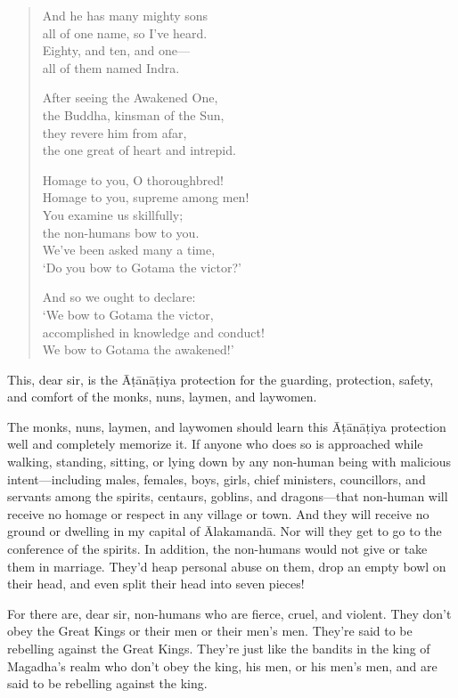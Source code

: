 \documentclass[12pt,openany]{book}%
\begin{document}
\begin{verse}
And he has many mighty sons \\
all of one name, so I’ve heard. \\
Eighty, and ten, and one—\\
all of them named Indra. 

After seeing the Awakened One, \\
the Buddha, kinsman of the Sun, \\
they revere him from afar, \\
the one great of heart and intrepid. 

Homage to you, O thoroughbred! \\
Homage to you, supreme among men! \\
You examine us skillfully; \\
the non-humans bow to you. \\
We’ve been asked many a time, \\
‘Do you bow to Gotama the victor?’ 

And so we ought to declare: \\
‘We bow to Gotama the victor, \\
accomplished in knowledge and conduct! \\
We bow to Gotama the awakened!’ 

%
\end{verse}

This, dear sir, is the \textsanskrit{Āṭānāṭiya} protection for the guarding, protection, safety, and comfort of the monks, nuns, laymen, and laywomen. 

The monks, nuns, laymen, and laywomen should learn this \textsanskrit{Āṭānāṭiya} protection well and completely memorize it. If anyone who does so is approached while walking, standing, sitting, or lying down by any non-human being with malicious intent—including males, females, boys, girls, chief ministers, councillors, and servants among the spirits, centaurs, goblins, and dragons—that non-human will receive no homage or respect in any village or town. And they will receive no ground or dwelling in my capital of \textsanskrit{Ālakamandā}. Nor will they get to go to the conference of the spirits. In addition, the non-humans would not give or take them in marriage. They’d heap personal abuse on them, drop an empty bowl on their head, and even split their head into seven pieces! 

For there are, dear sir, non-humans who are fierce, cruel, and violent. They don’t obey the Great Kings or their men or their men’s men. They’re said to be rebelling against the Great Kings. They’re just like the bandits in the king of Magadha’s realm who don’t obey the king, his men, or his men’s men, and are said to be rebelling against the king. 
\end{document}

